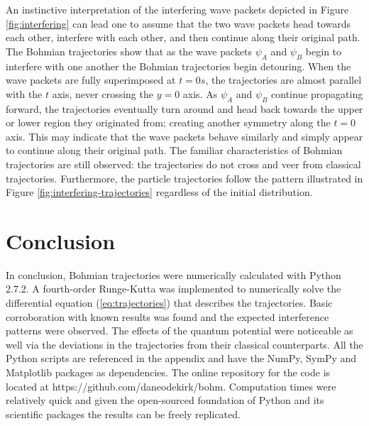 \documentclass[10pt, reqno]{article}
\begin{document}
  An instinctive interpretation of the interfering wave packets depicted in Figure \ref{fig:interfering} can lead one to assume that the two wave packets 
    head towards each other, interfere with each other, and then continue along their original path.
  The Bohmian trajectories show that as the wave packets $\psi_A$ and $\psi_B$ begin to interfere with one another the Bohmian trajectories begin detouring.
  When the wave packets are fully superimposed at $t=0s$, the trajectories are almost parallel with the $t$ axis, never crossing the $y=0$ axis. 
  As $\psi_A$ and $\psi_B$ continue propagating forward, the trajectories eventually turn around and head back towards the upper or lower region they originated from;
    creating another symmetry along the $t=0$ axis.
  This may indicate that the wave packets behave similarly and simply appear to continue along their original path.
  The familiar characteristics of Bohmian trajectories are still observed: the trajectories do not cross and veer from classical trajectories.
  Furthermore, the particle trajectories follow the pattern illustrated in Figure \ref{fig:interfering-trajectories} regardless of the initial distribution.

\section{Conclusion}

  In conclusion, Bohmian trajectories were numerically calculated with Python 2.7.2.
  A fourth-order Runge-Kutta was implemented to numerically solve the differential equation (\ref{eq:trajectories}) that describes the trajectories.
  Basic corroboration with known results was found and the expected interference patterns were observed.
  The effects of the quantum potential were noticeable as well via the deviations in the trajectories from their classical counterparts.
  All the Python scripts are referenced in the appendix and have the NumPy, SymPy and Matplotlib packages as dependencies.
  The online repository for the code is located at https://github.com/daneodekirk/bohm.
  Computation times were relatively quick and given the open-sourced foundation of Python and its scientific packages the results can be freely replicated.

\pagebreak




\pagebreak

\appendix
{}
\end{document}
